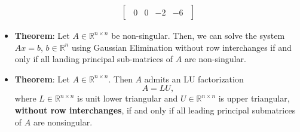 \documentclass{report}
\begin{document}
\begin{itemize}
\begin{align*}
\begin{bmatrix}
\begin{array}{ccc|c}
                    0 & 0 & -2 & -6
                \end{array}
            \end{bmatrix}
        \end{align*}
    \item \textbf{Theorem}: Let $A \in \mathbb{R}^{n\times n}$ be non-singular. Then, we can solve the system $Ax = b$, $b \in \mathbb{R}^{n}$ using Gaussian Elimination without row interchanges if and only if all landing principal sub-matrices of $A$ are non-singular.
    \item \textbf{Theorem}: Let $A \in \mathbb{R}^{n \times n}$. Then $A$ admits an LU factorization
            \[
                A = LU,
            \]
            where $L \in \mathbb{R}^{n \times n}$ is unit lower triangular and 
            $U \in \mathbb{R}^{n \times n}$ is upper triangular, 
            \textbf{without row interchanges}, if and only if all leading principal 
            submatrices of $A$ are nonsingular.


\end{itemize}
\end{document}
